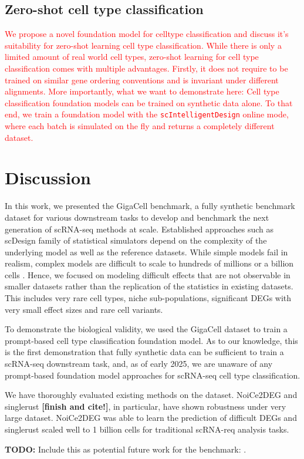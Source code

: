 \documentclass{article}
\newcommand{\phflo}[1]{\textcolor{red}{#1}}
\begin{document}
\subsection{Zero-shot cell type classification}

\phflo{We propose a novel foundation model for celltype classification and discuss it's suitability for zero-shot learning cell type classification. While there is only a limited amount of real world cell types, zero-shot learning for cell type classification comes with multiple advantages. Firstly, it does not require to be trained on similar gene ordering conventions and is invariant under different alignments. More importantly, what we want to demonstrate here: Cell type classification foundation models can be trained on synthetic data alone. To that end, we train a foundation model with the \texttt{scIntelligentDesign} online mode, where each batch is simulated on the fly and returns a completely different dataset.}


\clearpage
\section{Discussion}

In this work, we presented the GigaCell benchmark, a fully synthetic benchmark dataset for various downstream tasks to develop and benchmark the next generation of scRNA-seq methods at scale. Established approaches such as scDesign family of statistical simulators \cite{scdesign, scdesign2, scdesign3} depend on the complexity of the underlying model as well as the reference datasets. While simple models fail in realism, complex models are difficult to scale to hundreds of millions or a billion cells \cite{duo2024systematic}. Hence, we focused on modeling difficult effects that are not observable in smaller datasets rather than the replication of the statistics in existing datasets. This includes very rare cell types, niche sub-populations, significant DEGs with very small effect sizes and rare cell variants. 

To demonstrate the biological validity, we used the GigaCell dataset to train a prompt-based cell type classification foundation model. As to our knowledge, this is the first demonstration that fully synthetic data can be sufficient to train a scRNA-seq downstream task, and, as of early 2025, we are unaware of any prompt-based foundation model approaches for scRNA-seq cell type classification. 

We have thoroughly evaluated existing methods on the dataset. NoiCe2DEG and singlerust \textbf{[finish and cite!]}, in particular, have shown robustness under very large dataset. NoiCe2DEG was able to learn the prediction of difficult DEGs and singlerust scaled well to 1 billion cells for traditional scRNA-req analysis tasks. 

\textbf{TODO:} Include this as potential future work for the benchmark: \cite{smbatyan2025can}.



\end{document}
